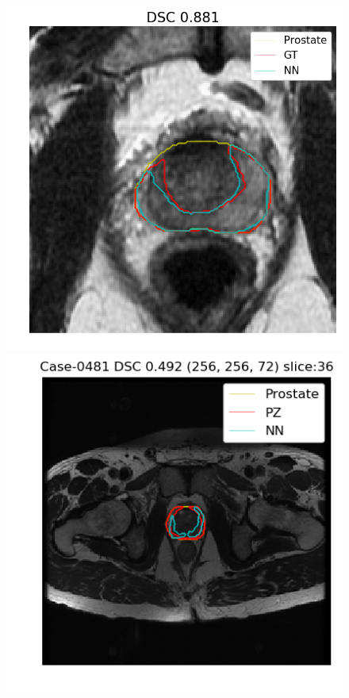 \begin{figure}[h]
    \includegraphics[totalheight=.2\textheight]{imgs/results/PZ_GE__GE_yes_ROI_MAX_Case-0508.png}
    \vspace{10mm}
    \includegraphics[totalheight=.2\textheight]{imgs/results/PZ_GE__GE_yes_Original_MIN_Case-0481.png}

\end{figure}

